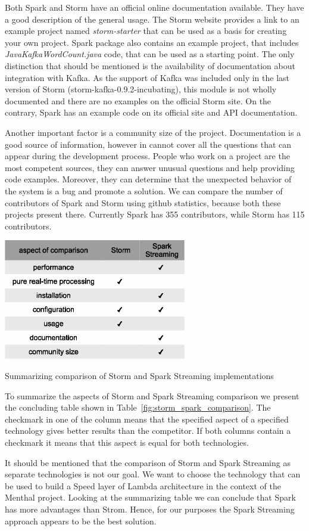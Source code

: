 Both Spark and Storm have an official online documentation available.
They have a good description of the general usage.
The Storm website provides a link to an example project named \textit{storm-starter} that can be used as a basis for creating your own project.
Spark package also contains an example project, that includes \textit{JavaKafkaWordCount.java} code, that can be used as a starting point. 
The only distinction that should be mentioned is the availability of documentation about integration with Kafka.
As the support of Kafka was included only in the last version of Storm (storm-kafka-0.9.2-incubating), this module is not wholly documented and there are no examples on the official Storm site.
On the contrary, Spark has an example code on its official site and API documentation. 

Another important factor is a community size of the project.
Documentation is a good source of information, however in cannot cover all the questions that can appear during the development process.
People who work on a project are the most competent sources, they can answer unusual questions and help providing code examples.
Moreover, they can determine that the unexpected behavior of the system is a bug and promote a solution.
We can compare the number of contributors of Spark and Storm using github statistics, because both these projects present there.
Currently Spark has 355 contributors, while Storm has 115 contributors. 

\begin{table}[h]
  \centering
  \includegraphics [width=0.6\textwidth]{images/storm_spark_comparison}
  \caption{Summarizing comparison of Storm and Spark Streaming implementations}
  \label{fig:storm_spark_comparison}
\end{table}

To summarize the aspects of Storm and Spark Streaming comparison we present the concluding table shown in Table~\ref{fig:storm_spark_comparison}.
The checkmark in one of the column means that the specified aspect of a specified technology gives better results than the competitor.
If both columns contain a checkmark it means that this aspect is equal for both technologies.

It should be mentioned that the comparison of Storm and Spark Streaming as separate technologies is not our goal.
We want to choose the technology that can be used to build a Speed layer of Lambda architecture in the context of the Menthal project.
Looking at the summarizing table we can conclude that Spark has more advantages than Strom.
Hence, for our purposes the Spark Streaming approach appears to be the best solution.